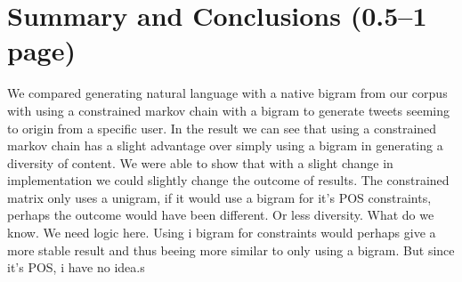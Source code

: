 \documentclass[a4paper,12pt]{article}
\begin{document}
\section{Summary and Conclusions (0.5--1 page)}
\label{sec:summary}
We compared generating natural language with a native bigram from our corpus with using a constrained markov chain with a bigram to generate tweets seeming to origin from a specific user.
In the result we can see that using a constrained markov chain has a slight advantage over simply using a bigram in generating a diversity of content. %
We were able to show that with a slight change in implementation we could slightly change the outcome of results. 
The constrained matrix only uses a unigram, if it would use a bigram for it's POS constraints, perhaps the outcome would have been different. Or less diversity. What do we know. We need logic here.
Using i bigram for constraints would perhaps give a more stable result and thus beeing more similar to only using a bigram. But since it's POS, i have no idea.s



\end{document}
